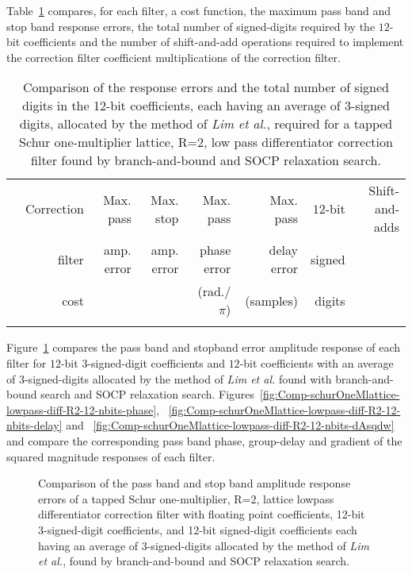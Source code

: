 \documentclass[a4paper,twoside,10pt,english]{article}
\newcommand{\DesignOfSchurLatticeFiltersPdfScale}{1}
\begin{document}
Table~\ref{tab:Comp-schurOneMlattice-lowpass-diff-R2-12-nbits-cost}
compares, for each filter, a cost function, the maximum pass band and stop band
response errors, the total number of signed-digits required by the $12$-bit 
coefficients and the number of shift-and-add operations required to implement
the correction filter coefficient multiplications of the correction filter.
\begin{table}[!hb]
\centering
\begin{threeparttable}
\begin{tabular}{lrrrrrrr} \\ \toprule
 &Correction&Max. pass&Max. stop  &Max. pass &Max. pass&$12$-bit&Shift-and-adds\\
 &filter    &amp. error&amp. error&phase error&delay error&signed& \\
 &cost      &          &        &(rad./$\pi$)&(samples)  &digits& \\
\midrule

\\ \bottomrule
\end{tabular}
\end{threeparttable}
\caption[Comparison of low pass differentiator filter fixed point implementations]
{Comparison of the response errors and the total number of signed digits in the
  12-bit coefficients, each having an average of 3-signed digits, allocated by
  the method of \emph{Lim et al.}, required for a tapped Schur one-multiplier
  lattice, R=2, low pass differentiator correction filter found by
  branch-and-bound and SOCP relaxation search.}
\label{tab:Comp-schurOneMlattice-lowpass-diff-R2-12-nbits-cost}
\end{table}

Figure~\ref{fig:Comp-schurOneMlattice-lowpass-diff-R2-12-nbits-amplitude}
compares the pass band and stopband error amplitude response of each filter for
$12$-bit $3$-signed-digit coefficients and $12$-bit coefficients with an average
of $3$-signed-digits allocated by the method of \emph{Lim et al.} found with
branch-and-bound search and SOCP relaxation search.
Figures~\ref{fig:Comp-schurOneMlattice-lowpass-diff-R2-12-nbits-phase},
~\ref{fig:Comp-schurOneMlattice-lowpass-diff-R2-12-nbits-delay} and
~\ref{fig:Comp-schurOneMlattice-lowpass-diff-R2-12-nbits-dAsqdw} and
compare the corresponding pass band phase, group-delay and gradient of the
squared magnitude responses of each filter.

\begin{figure}[!hb]
\centering
\scalebox{\DesignOfSchurLatticeFiltersPdfScale}{}
\caption{Comparison of the pass band and stop band amplitude response errors of
  a tapped Schur one-multiplier, R=2, lattice lowpass differentiator correction
  filter with floating point coefficients, 12-bit 3-signed-digit coefficients,
  and 12-bit signed-digit coefficients each having an average of 3-signed-digits
  allocated by the method of \emph{Lim et al.}, found by branch-and-bound and
  SOCP relaxation search.}
\label{fig:Comp-schurOneMlattice-lowpass-diff-R2-12-nbits-amplitude}
\end{figure}
\end{document}
